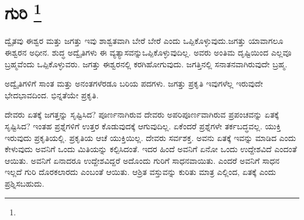 
\chapter[ಗುರಿ ]{ಗುರಿ \protect\footnote{}}

ದ್ವೈತವು ಈಶ್ವರ ಮತ್ತು ಜಗತ್ತು ಇವು ಶಾಶ್ವತವಾಗಿ ಬೇರೆ ಬೇರೆ ಎಂದು ಒಪ್ಪಿಕೊಳ್ಳುವುದು.\break ಜಗತ್ತು ಯಾವಾಗಲೂ ಈಶ್ವರನ ಅಧೀನ. ಶುದ್ಧ ಅದ್ವೈತಿಗಳು ಈ ವ್ಯತ್ಯಾಸವನ್ನು\break ಒಪ್ಪಿಕೊಳ್ಳುವುದಿಲ್ಲ. ಅವರು ಅಂತಿಮ ದೃಷ್ಟಿಯಿಂದ ಎಲ್ಲವೂ ಬ್ರಹ್ಮವೆಂದು ಒಪ್ಪಿಕೊಳ್ಳುವರು. ಜಗತ್ತು ಈಶ್ವರನಲ್ಲಿ ಕರಗಿಹೋಗುವುದು. ಜಗತ್ತಿನಲ್ಲಿ ಸನಾತನವಾಗಿರುವುದೇ ಬ್ರಹ್ಮ.

ಅದ್ವೈತಿಗಳಿಗೆ ಸಾಂತ ಮತ್ತು ಅನಂತಗಳೆರಡೂ ಬರಿಯ ಪದಗಳು. ಜಗತ್ತು ಪ್ರಕೃತಿ ಇವುಗಳೆಲ್ಲ ಇರುವುದೇ ಭೇದಭಾವದಿಂದ. ಭಿನ್ನತೆಯೇ ಪ್ರಕೃತಿ.

ದೇವರು ಏತಕ್ಕೆ ಜಗತ್ತನ್ನು ಸೃಷ್ಟಿಸಿದ? ಪೂರ್ಣನಾಗಿರುವ ದೇವರು ಅಪರಿಪೂರ್ಣವಾಗಿರುವ ಪ್ರಪಂಚವನ್ನು ಏತಕ್ಕೆ ಸೃಷ್ಟಿಸಿದ? ಇಂತಹ ಪ್ರಶ್ನೆಗಳಿಗೆ ಉತ್ತರ ಕೊಡುವುದಕ್ಕೆ ಆಗುವುದಿಲ್ಲ. ಏಕೆಂದರೆ ಪ್ರಶ್ನೆಗಳೇ ತರ್ಕಬದ್ಧವಲ್ಲ. ಯುಕ್ತಿ ಇರುವುದು ಪ್ರಕೃತಿಯಲ್ಲಿ. ಪ್ರಕೃತಿಯ ಆಚೆ ಯುಕ್ತಿಯಿಲ್ಲ. ದೇವರು ಸರ್ವಶಕ್ತ. ಅವನು ಏತಕ್ಕೆ ಇವನ್ನು ಮಾಡಿದ ಎಂದು ಕೇಳುವುದು ಅವನಿಗೆ ಒಂದು ಮಿತಿಯನ್ನು ಕಲ್ಪಿಸಿದಂತೆ. ಇದರ ಹಿಂದೆ ಅವನಿಗೆ ಏನೋ ಒಂದು ಉದ್ದೇಶವಿದೆ ಎಂದಂತೆ ಆಯಿತು. ಅವನಿಗೆ ಏನಾದರೂ ಉದ್ದೇಶವಿದ್ದರೆ ಅದೊಂದು ಗುರಿಗೆ ಸಾಧನವಾಯಿತು. ಎಂದರೆ ಅವನಿಗೆ ಸಾಧನ ಇಲ್ಲದೆ ಗುರಿ ದೊರಕಲಾರದು ಎಂಬಂತೆ ಆಯಿತು. ಆಶ್ರಿತ ವಸ್ತುವನ್ನು ಕುರಿತು ಮಾತ್ರ ಎಲ್ಲಿಂದ, ಏತಕ್ಕೆ ಎಂದು ಪ್ರಶ್ನಿಸಬಹುದು.

